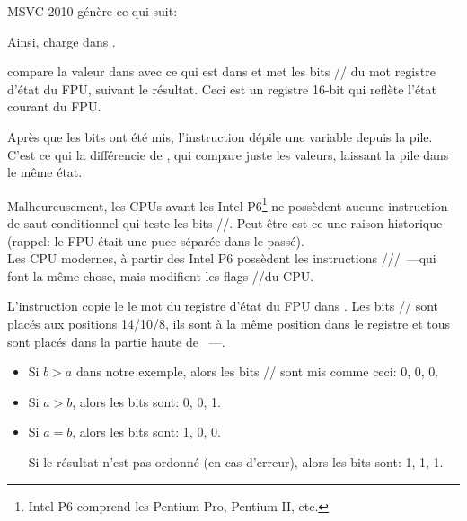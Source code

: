 
MSVC 2010 génère ce qui suit:




Ainsi, \FLD charge  dans .

\label{Czero_etc}
\newcommand{\Czero}{\GTT{C0}\xspace}
\newcommand{\Ctwo}{\GTT{C2}\xspace}
\newcommand{\Cthree}{\GTT{C3}\xspace}
\newcommand{\CThreeBits}{\Cthree/\Ctwo/\Czero}


\FCOMP compare la valeur dans  avec ce qui est dans  et met les bits
\CThreeBits du mot registre d'état du FPU, suivant le résultat.
Ceci est un registre 16-bit qui reflète l'état courant du FPU.

Après que les bits ont été mis, l'instruction \FCOMP dépile une variable depuis la
pile.
C'est ce qui la différencie de \FCOM, qui compare juste les valeurs, laissant la
pile dans le même état.

Malheureusement, les CPUs avant les Intel P6\footnote{Intel P6 comprend les Pentium
Pro, Pentium II, etc.} ne possèdent aucune instruction de saut conditionnel qui teste
les bits \CThreeBits.
Peut-être est-ce une raison historique (rappel: le FPU était une puce séparée dans
le passé).\\Les CPU modernes, à partir des Intel P6 possèdent les instructions \FCOMI/\FCOMIP/\FUCOMI/\FUCOMIP~---qui
font la même chose, mais modifient les flags \ZF/\PF/\CF du CPU.


L'instruction \FNSTSW copie le le mot du registre d'état du FPU dans \AX.
Les bits \CThreeBits sont placés aux positions 14/10/8, ils sont à la même position
dans le registre \AX et tous sont placés dans la partie haute de \AX{}~---\AH{}.

\begin{itemize}
\item Si $b>a$ dans notre exemple, alors les bits \CThreeBits sont mis comme ceci: 0, 0, 0.
\item Si $a>b$, alors les bits sont: 0, 0, 1.
\item Si $a=b$, alors les bits sont: 1, 0, 0.

Si le résultat n'est pas ordonné (en cas d'erreur), alors les bits sont: 1, 1, 1.
\end{itemize}

